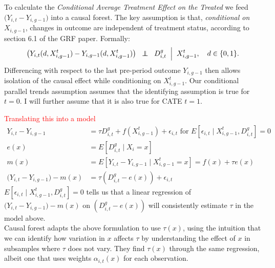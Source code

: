 \documentclass[source/paper/main.tex]{subfiles}
\begin{document}
To calculate the \emph{Conditional Average Treatment Effect on the Treated} we feed $\bigl(Y_{i,t} - Y_{i,g-1}\bigr)$ into a causal forest. The key assumption is that, \emph{conditional on $X_{i,g-1}$}, changes in outcome are independent of treatment status, according to section 6.1 of the GRF paper. Formally:
\[
    \bigl(Y_{i,t}(d, X_{i,g-1}^t) - Y_{i,g-1}(d, X_{i,g-1}^t)\bigr)
    \;\;\independent\;\;
    D_{i,t}^g
    \;\Bigm|\;
    X_{i,g-1}^t,\quad d \in \{0,1\}.
\]
Differencing with respect to the last pre-period outcome $Y_{i,g-1}$ then allows isolation of the causal effect while conditioning on $X_{i,g-1}^t$.
Our conditional parallel trends assumption assumes that the identifying assumption is true for $t=0$. I will further assume that it is also true for CATE $t=1$. 


\textcolor{red}{Translating this into a model}
\begin{align*}
    Y_{i,t} - Y_{i,g-1} &= \tau  D_{i,t}^g  + f(X_{i,g-1}^t) + \epsilon_{i,t} \text{ for } E[\epsilon_{i,t} \mid X_{i,g-1}^t, D_{i,t}^g] = 0\\
    e(x) &= E[D_{i,t}^g  \mid X_i = x] \\
    m(x) &= E[Y_{i,t} - Y_{i,g-1} \mid X_{i,g-1}^t = x] = f(x) + \tau e(x)\\
    \bigl(Y_{i,t} - Y_{i,g-1} \bigr) - m(x) &= \tau (D_{i,t}^g - e(x)) + \epsilon_{i,t}
\end{align*}
$E[\epsilon_{i,t} \mid X_{i,g-1}^t, D_{i,t}^g] = 0$ tells us that a linear regression of $\bigl(Y_{i,t} - Y_{i,g-1} \bigr) - m(x)$ on $(D_{i,t}^g - e(x))$ will consistently estimate $\tau$ in the model above. \\
Causal forest adapts the above formulation to use $\tau(x)$, using the intuition that we can identify how variation in $x$ affects $\tau$ by understanding the effect of $x$ in subsamples where $\tau$ does not vary. They find $\tau(x)$ through the same regression, albeit one that uses weights $\alpha_{i,t}(x)$ for each observation. 
\end{document}
